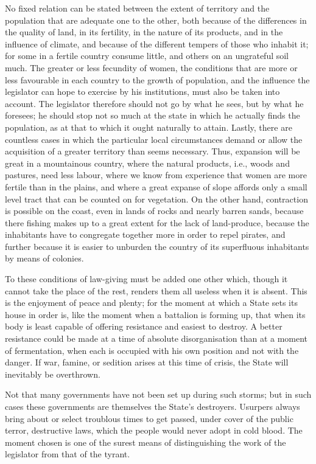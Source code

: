 \documentclass[12pt]{book}
\begin{document}
No fixed relation can be stated between the extent of territory and the population that are adequate one to the other, both because of the differences in the quality of land, in its fertility, in the nature of its products, and in the influence of climate, and because of the different tempers of those who inhabit it; for some in a fertile country consume little, and others on an ungrateful soil much. The greater or less fecundity of women, the conditions that are more or less favourable in each country to the growth of population, and the influence the legislator can hope to exercise by his institutions, must also be taken into account. The legislator therefore should not go by what he sees, but by what he foresees; he should stop not so much at the state in which he actually finds the population, as at that to which it ought naturally to attain. Lastly, there are countless cases in which the particular local circumstances demand or allow the acquisition of a greater territory than seems necessary. Thus, expansion will be great in a mountainous country, where the natural products, i.e., woods and pastures, need less labour, where we know from experience that women are more fertile than in the plains, and where a great expanse of slope affords only a small level tract that can be counted on for vegetation. On the other hand, contraction is possible on the coast, even in lands of rocks and nearly barren sands, because there fishing makes up to a great extent for the lack of land-produce, because the inhabitants have to congregate together more in order to repel pirates, and further because it is easier to unburden the country of its superfluous inhabitants by means of colonies.

To these conditions of law-giving must be added one other which, though it cannot take the place of the rest, renders them all useless when it is absent. This is the enjoyment of peace and plenty; for the moment at which a State sets its house in order is, like the moment when a battalion is forming up, that when its body is least capable of offering resistance and easiest to destroy. A better resistance could be made at a time of absolute disorganisation than at a moment of fermentation, when each is occupied with his own position and not with the danger. If war, famine, or sedition arises at this time of crisis, the State will inevitably be overthrown.

Not that many governments have not been set up during such storms; but in such cases these governments are themselves the State's destroyers. Usurpers always bring about or select troublous times to get passed, under cover of the public terror, destructive laws, which the people would never adopt in cold blood. The moment chosen is one of the surest means of distinguishing the work of the legislator from that of the tyrant.
\end{document}
